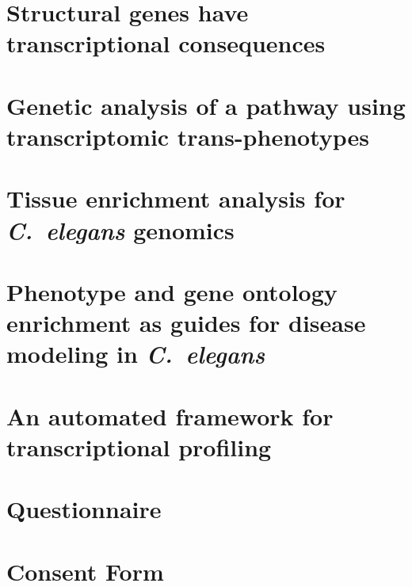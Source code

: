 \documentclass[12pt]{caltech_thesis}
\newcommand{\cel}{\emph{C.~elegans}}
\begin{document}
\chapter{Structural genes have transcriptional consequences}
\begin{refsection}
\end{refsection}

\chapter{Genetic analysis of a pathway using transcriptomic trans-phenotypes}
\begin{refsection}
\end{refsection}

\chapter{Tissue enrichment analysis for \cel{} genomics}
\begin{refsection}
  
  \printbibliography[heading=subbibliography]
\end{refsection}

\chapter{Phenotype and gene ontology enrichment as guides for disease modeling
         in \cel{}}
\begin{refsection}
  
  \printbibliography[heading=subbibliography]
\end{refsection}

\chapter{An automated framework for transcriptional profiling}
\begin{refsection}
\end{refsection}




\appendix

\chapter{Questionnaire}
\chapter{Consent Form}

\printindex

\theendnotes{}

\end{document}
